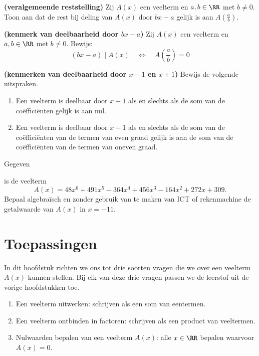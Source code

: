 \documentclass{ximera}
\begin{document}
\begin{Uitbreiding}
\begin{Oefening}
{\bf (veralgemeende reststelling)}
Zij $A(x)$ een veelterm en $a,b \in \RR$ met $b \neq 0$. Toon aan dat de rest bij deling van $A(x)$ door $bx-a$ gelijk is aan $A\left(\frac{a}{b}\right)$.
\end{Oefening}

\begin{Oefening}
{\bf (kenmerk van deelbaarheid door $bx-a$)}
Zij $A(x)$ een veelterm en $a,b \in \RR$ met $b \neq 0$. Bewijs:
\[
(bx-a) \mid A(x) \quad \Leftrightarrow \quad A\left(\frac{a}{b}\right) = 0
\]
\end{Oefening}

\begin{Oefening}
{\bf (kenmerken van deelbaarheid door $x-1$ en $x+1$)}
Bewijs de volgende uitspraken.
\begin{enumerate}

\item
Een veelterm is deelbaar door $x-1$ als en slechts als de som van de co\"effici\"enten gelijk is aan nul.
\item
Een veelterm is deelbaar door $x+1$ als en slechts als de som van de co\"effici\"enten van de termen van even graad gelijk is aan de som van de co\"effici\"enten van de termen van oneven graad.
\end{enumerate}
\end{Oefening}
\end{Uitbreiding}

\begin{Oefening}\setcounter{enumi}{20}   
\hypertarget{oef3.20}{Gegeven} is de veelterm
\[
A(x) = 48x^6 + 491 x^5 - 364x^4 + 456x^3 - 164x^2 + 272x + 309.
\]
Bepaal algebra\"isch en zonder gebruik van te maken van ICT of rekenmachine de getalwaarde van $A(x)$ in $x = -11$. 
\end{Oefening}


\chapter{Toepassingen}

In dit hoofdstuk richten we ons tot drie soorten vragen die we over een veelterm $A(x)$ kunnen stellen. Bij elk van deze drie vragen passen we de leerstof uit de vorige hoofdstukken toe. 
\begin{enumerate}
\item
Een veelterm uitwerken: schrijven als een som van eentermen. 
\item
Een veelterm ontbinden in factoren: schrijven als een product van veeltermen.
\item
Nulwaarden bepalen van een veelterm $A(x)$: alle $x \in \RR$ bepalen waarvoor $A(x) = 0$. 
\end{enumerate}
\end{document}
